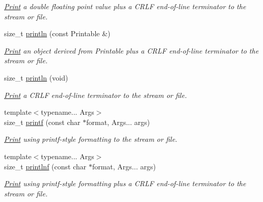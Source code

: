 \begin{DoxyCompactItemize}
\begin{DoxyCompactList}\small\item\em \mbox{\hyperlink{class_print}{Print}} a double floating point value plus a C\+R\+LF end-\/of-\/line terminator to the stream or file. \end{DoxyCompactList}\item 
\mbox{\label{class_print_a20f9e104153b62e720c9b4c348b44f00}} 
size\+\_\+t \mbox{\hyperlink{class_print_a20f9e104153b62e720c9b4c348b44f00}{println}} (const Printable \&)
\begin{DoxyCompactList}\small\item\em \mbox{\hyperlink{class_print}{Print}} an object derived from Printable plus a C\+R\+LF end-\/of-\/line terminator to the stream or file. \end{DoxyCompactList}\item 
\mbox{\label{class_print_a169b128f9e22f0c15883768f580541a2}} 
size\+\_\+t \mbox{\hyperlink{class_print_a169b128f9e22f0c15883768f580541a2}{println}} (void)
\begin{DoxyCompactList}\small\item\em \mbox{\hyperlink{class_print}{Print}} a C\+R\+LF end-\/of-\/line terminator to the stream or file. \end{DoxyCompactList}\item 
{\footnotesize template$<$typename... Args$>$ }\\size\+\_\+t \mbox{\hyperlink{class_print_a08a461c9fee5fd8f5795d6e9f61e3d5b}{printf}} (const char $\ast$format, Args... args)
\begin{DoxyCompactList}\small\item\em \mbox{\hyperlink{class_print}{Print}} using printf-\/style formatting to the stream or file. \end{DoxyCompactList}\item 
{\footnotesize template$<$typename... Args$>$ }\\size\+\_\+t \mbox{\hyperlink{class_print_afa41aa5211c54b7b4d79b9286880c337}{printlnf}} (const char $\ast$format, Args... args)
\begin{DoxyCompactList}\small\item\em \mbox{\hyperlink{class_print}{Print}} using printf-\/style formatting plus a C\+R\+LF end-\/of-\/line terminator to the stream or file. \end{DoxyCompactList}\end{DoxyCompactItemize}


